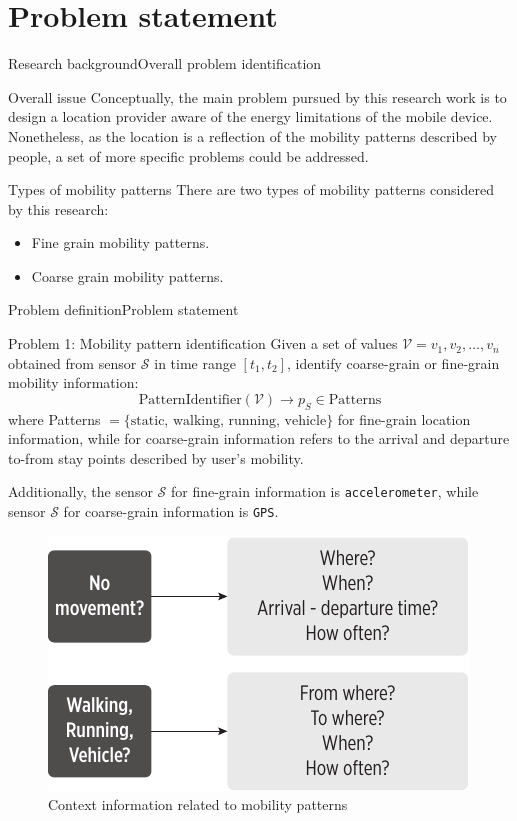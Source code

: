 \documentclass[8pt,xcolor={dvipsnames},handout]{beamer}
\begin{document}
\section{Problem statement}
\begin{frame}{Research background}{Overall problem identification}
\begin{exampleblock}{Overall issue}
Conceptually, the main problem pursued by this research work is to design a location provider aware of the energy limitations of the mobile device.
Nonetheless, as the location is a reflection of the mobility patterns described by people, a set of more specific problems could be addressed.
\end{exampleblock}

\begin{exampleblock}{Types of mobility patterns}
There are two types of mobility patterns considered by this research:
\begin{itemize}
  \item Fine grain mobility patterns.
  \item Coarse grain mobility patterns.
\end{itemize}
\end{exampleblock}
\end{frame}

\begin{frame}{Problem definition}{Problem statement}
\begin{alertblock}{Problem 1: Mobility pattern identification}
Given a set of values $\mathcal{V} = v_1,v_2,\ldots,v_n$ obtained from sensor $\mathcal{S}$ in time range $[t_1,t_2]$, identify coarse-grain or fine-grain mobility information:
$$
\text{PatternIdentifier}(\mathcal{V}) \rightarrow p_S \in \text{Patterns}
$$
where Patterns  $ = \{ \text{static, walking, running, vehicle} \}$ for fine-grain location information, while for coarse-grain information refers to the arrival and departure to-from stay points described by user's mobility.

Additionally, the sensor $\mathcal{S}$ for fine-grain information is \texttt{accelerometer}, while sensor $\mathcal{S}$ for coarse-grain information is \texttt{GPS}.
\begin{figure}[tb]
  \centering
  \includegraphics[scale=0.5]{vectors/mobility-patterns-implications}
  \caption{Context information related to mobility patterns}
  \label{fig:mobility-patterns-implications}
\end{figure}
\end{alertblock}
\end{frame}
\end{document}
